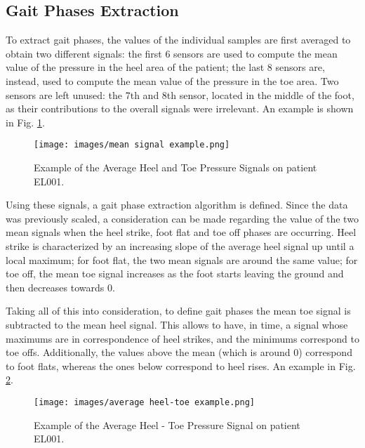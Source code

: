 \subsection{Gait Phases Extraction}
To extract gait phases, the values of the individual samples are first averaged to obtain two different signals: the first 6 sensors are used to compute the mean value of the pressure in the heel area of the patient; the last 8 sensors are, instead, used to compute the mean value of the pressure in the toe area. Two sensors are left unused: the 7th and 8th sensor, located in the middle of the foot, as their contributions to the overall signals were irrelevant. An example is shown in Fig. \ref{fig:Example of the Average Heel and Toe Pressure Signals on patient EL001.}.

\begin{figure}[ht!]
    \centering
    \texttt{[image: images/mean signal example.png]}
    \caption{Example of the Average Heel and Toe Pressure Signals on patient EL001.}
    \label{fig:Example of the Average Heel and Toe Pressure Signals on patient EL001.}
\end{figure}

Using these signals, a gait phase extraction algorithm is defined. Since the data was previously scaled, a consideration can be made regarding the value of the two mean signals when the heel strike, foot flat and toe off phases are occurring.
Heel strike is characterized by an increasing slope of the average heel signal up until a local maximum; for foot flat, the two mean signals are around the same value; for toe off, the mean toe signal increases as the foot starts leaving the ground and then decreases towards 0.


Taking all of this into consideration, to define gait phases the mean toe signal is subtracted to the mean heel signal. This allows to have, in time, a signal whose maximums are in correspondence of heel strikes, and the minimums correspond to toe offs. Additionally, the values above the mean (which is around 0) correspond to foot flats, whereas the ones below correspond to heel rises. An example in Fig. \ref{fig:Example of the Average Heel - Toe Pressure Signal on patient EL001.}.

\begin{figure}[ht!]
    \centering
    \texttt{[image: images/average heel-toe example.png]}
    \caption{Example of the Average Heel - Toe Pressure Signal on patient EL001.}
    \label{fig:Example of the Average Heel - Toe Pressure Signal on patient EL001.}
\end{figure}

